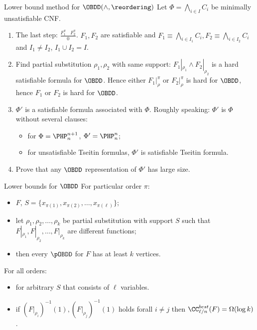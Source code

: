 \begin{frame}{Lower bound method for $\OBDD(\land, \reordering)$}
	Let $\Phi = \bigwedge\limits_{i \in I} C_i$ be minimally unsatisfiable CNF.
    \pause
    \begin{enumerate}
        \item The last step: $\frac{F_1^{\pi} ~~~~ F_2^{\pi}}{0}$. $F_1, F_2$ are satisfiable and
            $F_1 \equiv \bigwedge\limits_{i \in I_1} C_i, F_2 \equiv \bigwedge\limits_{i \in I_2} C_i$
            and $I_1 \neq I_2$, $I_1 \cup I_2 = I$.
        \pause
        \item Find partial substitution $\rho_1, \rho_2$ with same support: $F_1|_{\rho_1} \land
            F_2|_{\rho_2}$ is a hard satisfiable formula for $\OBDD$. Hence either $F_1|_{\rho}^{\pi}$ or
            $F_2|_{\rho}^{\pi}$ is hard for $\OBDD$, hence $F_1$ or $F_2$ is hard for $\OBDD$.
        \pause
        \item $\Phi'$ is a satisfiable formula associated with $\Phi$. Roughly speaking: $\Phi'$ is
            $\Phi$ without several clauses:
            \begin{itemize}
                \item for $\Phi = \PHP^{n + 1}_{n}$, $\Phi' = \PHP^{n}_{n}$;
                \item for unsatisfiable Tseitin formulas, $\Phi'$ is satisfiable Tseitin formula.
            \end{itemize}
        \item Prove that any $\OBDD$ representation of $\Phi'$ has large size.
        
    \end{enumerate}    
\end{frame}


\begin{frame}{Lower bounds for $\OBDD$}
	For particular order $\pi$:
    \begin{itemize}
        \item $F$, $S = \{x_{\pi(1)}, x_{\pi(2)}, \dots, x_{\pi(\ell)} \}$;
        \item let $\rho_1, \rho_2, \dots, \rho_k$ be partial substitution with support $S$ such that
            $F|_{\rho_1}, F|_{\rho_2}, \dots, F|_{\rho_k}$ are different functions;
        \item then every $\pOBDD$ for $F$ has at least $k$ vertices.
    \end{itemize}

    \pause
    For all orders:
    \begin{itemize}
        \item for arbitrary $S$ that consists of $\ell$ variables.
    \end{itemize}

    \pause

    \begin{itemize}
        \item if $(F|_{\rho_i})^{-1}(1), (F|_{\rho_j})^{-1}(1)$ holds forall $i \neq j$ then
            $\CC^{best}_{\ell / n} (F) = \Omega(\log k)$.
    \end{itemize}
    
\end{frame}

